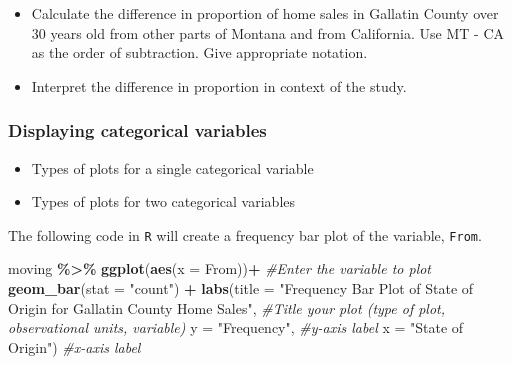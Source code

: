 \documentclass[
]{report}
\newenvironment{Shaded}{\begin{snugshade}}{\end{snugshade}}
\newcommand{\AttributeTok}[1]{\textcolor[rgb]{0.13,0.29,0.53}{#1}}
\newcommand{\CommentTok}[1]{\textcolor[rgb]{0.56,0.35,0.01}{\textit{#1}}}
\newcommand{\FunctionTok}[1]{\textcolor[rgb]{0.13,0.29,0.53}{\textbf{#1}}}
\newcommand{\NormalTok}[1]{#1}
\newcommand{\SpecialCharTok}[1]{\textcolor[rgb]{0.81,0.36,0.00}{\textbf{#1}}}
\newcommand{\StringTok}[1]{\textcolor[rgb]{0.31,0.60,0.02}{#1}}
\providecommand{\tightlist}{%
  \setlength{\itemsep}{0pt}\setlength{\parskip}{0pt}}
\begin{document}
\vspace{0.4in}

\begin{itemize}
\tightlist
\item
  Calculate the difference in proportion of home sales in Gallatin County over 30 years old from other parts of Montana and from California. Use MT - CA as the order of subtraction. Give appropriate notation.
\end{itemize}

\vspace{0.4in}

\begin{itemize}
\tightlist
\item
  Interpret the difference in proportion in context of the study.
\end{itemize}

\vspace{0.5in}

\hypertarget{displaying-categorical-variables}{%
\subsubsection*{Displaying categorical variables}\label{displaying-categorical-variables}}

\begin{itemize}
\tightlist
\item
  Types of plots for a single categorical variable
\end{itemize}

\vspace{0.4in}

\begin{itemize}
\tightlist
\item
  Types of plots for two categorical variables
\end{itemize}

\vspace{0.4in}

The following code in \texttt{R} will create a frequency bar plot of the variable, \texttt{From}.

\begin{Shaded}
\begin{Highlighting}[]
\NormalTok{moving }\SpecialCharTok{\%\textgreater{}\%}
    \FunctionTok{ggplot}\NormalTok{(}\FunctionTok{aes}\NormalTok{(}\AttributeTok{x =}\NormalTok{ From))}\SpecialCharTok{+} \CommentTok{\#Enter the variable to plot}
    \FunctionTok{geom\_bar}\NormalTok{(}\AttributeTok{stat =} \StringTok{"count"}\NormalTok{) }\SpecialCharTok{+} 
    \FunctionTok{labs}\NormalTok{(}\AttributeTok{title =} \StringTok{"Frequency Bar Plot of State of Origin for}
\StringTok{         Gallatin County Home Sales"}\NormalTok{, }
         \CommentTok{\#Title your plot (type of plot, observational units, variable)}
       \AttributeTok{y =} \StringTok{"Frequency"}\NormalTok{, }\CommentTok{\#y{-}axis label}
       \AttributeTok{x =} \StringTok{"State of Origin"}\NormalTok{) }\CommentTok{\#x{-}axis label}
\end{Highlighting}
\end{Shaded}
\end{document}
